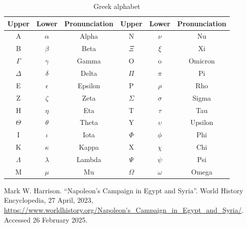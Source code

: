 \documentclass[b5paper]{article}
\begin{document}
 \begin{table}[htbp]
     \centering
     \begin{tabular}{|c|c|c||c|c|c|}
         \hline
               \textbf{Upper} & \textbf{Lower} & \textbf{Pronunciation} & \textbf{Upper} & \textbf{Lower} & \textbf{Pronunciation} \\
         \hline
         A         & $\alpha$    & Alpha &      N         & $\nu$         & Nu \\
         B         & $\beta$     & Beta &       $\Xi$         & $\xi$         & Xi \\
         $\Gamma$  & $\gamma$    & Gamma &      O    & o    & Omicron \\
         $\Delta$  & $\delta$    & Delta &      $\Pi$         & $\pi$         & Pi \\
         E         & $\epsilon$  & Epsilon &    P        & $\rho$        & Rho \\
         Z         & $\zeta$     & Zeta &       $\Sigma$      & $\sigma$      & Sigma \\
         H         & $\eta$      & Eta &        T        & $\tau$        & Tau \\
         $\Theta$  & $\theta$    & Theta &      Y    & $\upsilon$    & Upsilon \\
         I         & $\iota$     & Iota &       $\Phi$        & $\phi$        & Phi \\
         K         & $\kappa$    & Kappa &      X        & $\chi$        & Chi \\
         $\Lambda$ & $\lambda$   & Lambda &     $\Psi$        & $\psi$        & Psi \\
         M         & $\mu$       & Mu &         $\Omega$      & $\omega$      & Omega \\
         \hline
     \end{tabular}
     \caption{Greek alphabet}
     \label{tab:greek-alphabet}
 \end{table}

\begin{thebibliography}{99}

Mark W. Harrison. ``Napoleon's Campaign in Egypt and Syria''. World History Encyclopedia, 27 April, 2023, \url{https://www.worldhistory.org/Napoleon's_Campaign_in_Egypt_and_Syria/}. Accessed 26 February 2025.




\end{thebibliography}

\expandafter\enddocument

\fi
\end{document}
